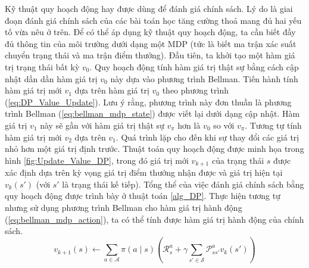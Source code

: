 Kỹ thuật quy hoạch động hay được dùng để đánh giá chính sách. 
Lý do là giai đoạn đánh giá chính sách của các bài toán học tăng cường thoả mang đủ hai yếu tố vừa nêu ở trên.
Để có thể áp dụng kỹ thuật quy hoạch động, ta cần biết đầy đủ thông tin của môi trường dưới dạng một MDP (tức là biết ma trận xác suất chuyển trạng thái và ma trận điểm thưởng).
Đầu tiên, ta khởi tạo một hàm giá trị trạng thái bất kỳ $v_0$.
Quy hoạch động tính hàm giá trị thật sự bằng cách cập nhật dần dần hàm giá trị $v_0$ này dựa vào phương trình Bellman. 
Tiến hành tính hàm giá trị mới $v_1$ dựa trên hàm giá trị $v_0$ theo phương trình (\ref{eq:DP_Value_Update}).
Lưu ý rằng, phương trình này đơn thuần là phương trình Bellman (\ref{eq:bellman_mdp_state}) được viết lại dưới dạng cập nhật.
Hàm giá trị $v_1$ này sẽ gần với hàm giá trị thật sự $v_\pi$ hơn là $v_0$ so với $v_\pi$.
Tương tự tính hàm giá trị mới $v_2$ dựa trên $v_1$. 
Quá trình lặp cho đến khi sự thay đổi các giá trị nhỏ hơn một giá trị định trước. 
Thuật toán quy hoạch động được minh họa trong hình \ref{fig:Update_Value_DP}, trong đó giá trị mới $v_{k+1}$ của trạng thái $s$ được xác định dựa trên kỳ vọng giá trị điểm thưởng nhận được và giá trị hiện tại $v_{k}(s')$ (với $s'$ là trạng thái kế tiếp). 
Tổng thể của việc đánh giá chính sách bằng quy hoạch động được trình bày ở thuật toán \ref{alg_DP}.
Thực hiện tương tự nhưng sử dụng phương trình Bellman cho hàm giá trị hành động (\ref{eq:bellman_mdp_action}), ta có thể tính được hàm giá trị hành động của chính sách.
\begin{equation}
v_{k+1}(s) \leftarrow \sum_{a \in \mathcal{A}}^{}\pi(a \mid s) \left( \mathcal{R}_{s}^{a} + \gamma \sum_{s' \in \mathcal{S}}^{}\mathcal{P}_{ss'}^{a}v_{k}(s') \right)
\label{eq:DP_Value_Update}
\end{equation}

